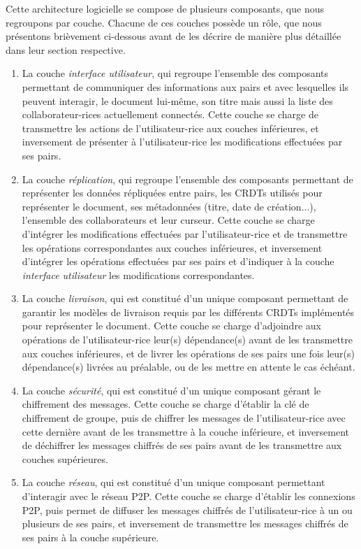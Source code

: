 Cette architecture logicielle se compose de plusieurs composants, que nous regroupons par couche.
Chacune de ces couches possède un rôle, que nous présentons brièvement ci-dessous avant de les décrire de manière plus détaillée dans leur section respective.
\begin{enumerate}
    \item La couche \emph{interface utilisateur}, qui regroupe l'ensemble des composants permettant de communiquer des informations aux pairs et avec lesquelles ils peuvent interagir, \ie le document lui-même, son titre mais aussi la liste des collaborateur-rices actuellement connectés.
        Cette couche se charge de transmettre les actions de l'utilisateur-rice aux couches inférieures, et inversement de présenter à l'utilisateur-rice les modifications effectuées par ses pairs.
    \item La couche \emph{réplication}, qui regroupe l'ensemble des composants permettant de représenter les données répliquées entre pairs, \ie les \acp{CRDT} utilisés pour représenter le document, ses métadonnées (titre, date de création...), l'ensemble des collaborateurs et leur curseur.
        Cette couche se charge d'intégrer les modifications effectuées par l'utilisateur-rice et de transmettre les opérations correspondantes aux couches inférieures, et inversement d'intégrer les opérations effectuées par ses pairs et d'indiquer à la couche \emph{interface utilisateur} les modifications correspondantes.
    \item La couche \emph{livraison}, qui est constitué d'un unique composant permettant de garantir les modèles de livraison requis par les différents \acp{CRDT} implémentés pour représenter le document.
        Cette couche se charge d'adjoindre aux opérations de l'utilisateur-rice leur(s) dépendance(s) avant de les transmettre aux couches inférieures, et de livrer les opérations de ses pairs une fois leur(s) dépendance(s) livrées au préalable, ou de les mettre en attente le cas échéant.
    \item La couche \emph{sécurité}, qui est constitué d'un unique composant gérant le chiffrement des messages.
        Cette couche se charge d'établir la clé de chiffrement de groupe, puis de chiffrer les messages de l'utilisateur-rice avec cette dernière avant de les transmettre à la couche inférieure, et inversement de déchiffrer les messages chiffrés de ses pairs avant de les transmettre aux couches supérieures.
    \item La couche \emph{réseau}, qui est constitué d'un unique composant permettant d'interagir avec le réseau \ac{P2P}.
        Cette couche se charge d'établir les connexions \ac{P2P}, puis permet de diffuser les messages chiffrés de l'utilisateur-rice à un ou plusieurs de ses pairs, et inversement de transmettre les messages chiffrés de ses pairs à la couche supérieure.
\end{enumerate}

